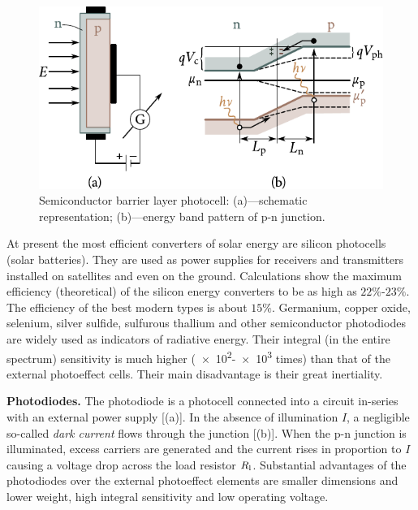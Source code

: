 \begin{figure}[t]
	\begin{center}
		\includegraphics[scale=1.0]{figures/ch_08/fig_8_23.pdf}
		\caption[]{Semiconductor barrier layer photocell: (a)---schematic representation; (b)---energy band pattern of p-n junction.}
		\label{fig:8_23}
	\end{center}
	\vspace{-0.8cm}
\end{figure}

At present the most efficient converters of solar energy are silicon photocells (solar batteries). They are used as power supplies for receivers and transmitters installed on satellites and even on the ground. Calculations show the maximum efficiency (theoretical) of the silicon energy converters to be as high as $22\%$-$23\%$. The efficiency of the best modern types is about $15\%$. Germanium, copper oxide, selenium, silver sulfide, sulfurous thallium and other semiconductor photodiodes are widely used as indicators of radiative energy. Their integral (in the entire spectrum) sensitivity is much higher (\num{e2}-\num{e3} times) than that of the external photoeffect cells. Their main disadvantage is their great inertiality.

\textbf{Photodiodes.} The photodiode is a photocell connected into a circuit in-series with an external power supply [(a)]. In the absence of illumination $I$, a negligible so-called \textit{dark current} flows through the junction [(b)]. When the p-n junction is illuminated, excess carriers are generated and the current rises in proportion to $I$ causing a voltage drop across the load resistor $R_{\text{l}}$. Substantial advantages of the photodiodes over the external photoeffect elements are smaller dimensions and lower weight, high integral sensitivity and low operating voltage.

